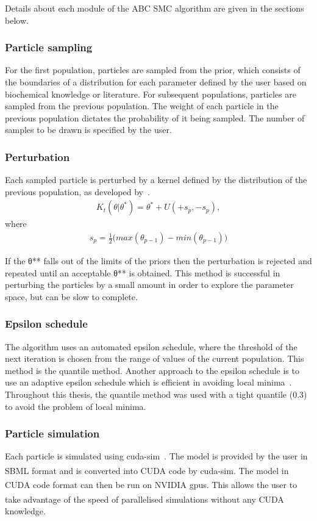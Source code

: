 \noindent Details about each module of the ABC SMC algorithm are given in the sections below. 


\subsubsection{Particle sampling}
\label{sec:part_samp}
For the first population, particles are sampled from the prior, which consists of the boundaries of a distribution for each parameter defined by the user based on biochemical knowledge or literature. For subsequent populations, particles are sampled from the previous population. The weight of each particle in the previous population dictates the probability of it being sampled. The number of samples to be drawn is specified by the user.  

\subsubsection{Perturbation}
\label{sec:pertub}
Each sampled particle is perturbed by a kernel defined by the distribution of the previous population, as developed by~\textcite{Toni:2009tr}. 
\begin{align}
K_t(\theta|\theta^* ) = \theta^* + U(+s_p, -s_p),
\end{align}
\noindent  where
\begin{align}
s_p = \frac{1}{2} \big (max(\theta_{p-1}) - min(\theta_{p-1}) \big )
\end{align}

\noindent If the θ** falls out of the limits of the priors then the perturbation is rejected and repeated until an acceptable θ** is obtained. This method is successful in perturbing the particles by a small amount in order to explore the parameter space, but can be slow to complete. 


\subsubsection{Epsilon schedule}
The algorithm uses an automated epsilon schedule, where the threshold of the next iteration is chosen from the range of values of the current population. This method is the quantile method. Another approach to the epsilon schedule is to use an adaptive epsilon schedule which is efficient in avoiding local minima~\autocite{Silk:2013bi}. Throughout this thesis, the quantile method was used with a tight quantile (0.3) to avoid the problem of local minima. 

\subsubsection{Particle simulation}
\label{sec:sim}
Each particle is simulated using cuda-sim~\autocite{Zhou:2011hp}. The model is provided by the user in SBML format and is converted into CUDA\textsuperscript{\textregistered} code by cuda-sim. The model in CUDA\textsuperscript{\textregistered} code format can then be run on NVIDIA\textsuperscript{\textregistered} \acrshort{gpu}s. This allows the user to take advantage of the speed of parallelised simulations without any CUDA\textsuperscript{\textregistered} knowledge. 


